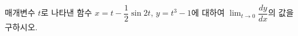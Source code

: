 매개변수 $t$로 나타낸 함수 $x=t-\dfrac{1}{2}\sin 2t$, $y=t^3-1$에 대하여 $\displaystyle\lim_{t\to 0}\dfrac{dy}{dx}$의 값을 구하시오.
